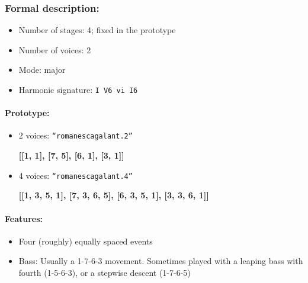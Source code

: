 ﻿\documentclass[11pt, openany]{article}
\begin{document}
\begin{itemize}
\subsubsection{Formal description:}
\begin{itemize}
\item Number of stages: 4; fixed in the prototype
\item Number of voices: 2
\item Mode: major
\item Harmonic signature: \texttt{I V6 vi I6}
\end{itemize}

\paragraph{Prototype:}
\begin{itemize}
\item 2 voices: \texttt{“romanescagalant.2”}
	\begin{center}
	\textbf{[[1, 1], [7, 5], [6, 1], [3, 1]]}
	\end{center}
\item 4 voices: \texttt{“romanescagalant.4”}
	\begin{center}
	\textbf{[[1, 3, 5, 1], [7, 3, 6, 5], [6, 3, 5, 1], [3, 3, 6, 1]]}
	\end{center}
\end{itemize}

\paragraph{Features:}
\begin{itemize}
\item Four (roughly) equally spaced events
\item Bass: Usually a 1-7-6-3 movement. Sometimes played with a leaping bass with fourth (1-5-6-3), or a stepwise descent (1-7-6-5)
\end{itemize}


\end{itemize}
\end{document}

